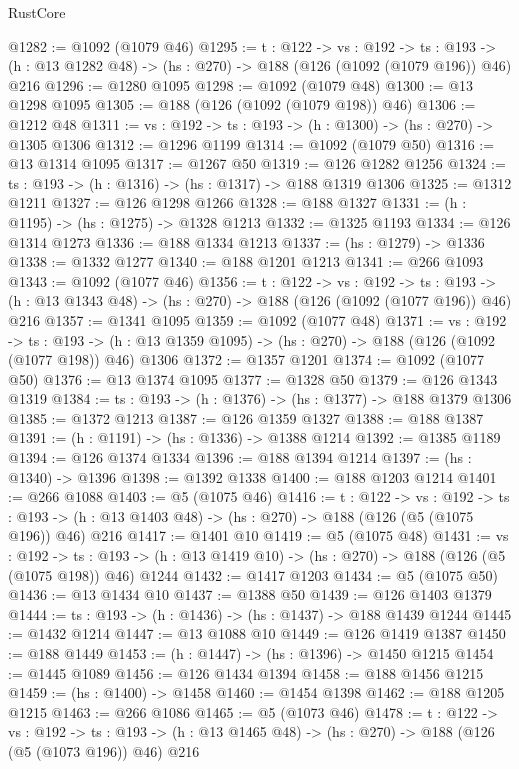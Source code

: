 \begin{lexlean}{RustCore}
\begin{coremodule}
@1282 := @1092 (@1079 @46)
@1295 := {t : @122} ->
  {vs : @192} ->
  {ts : @193} -> (h : @13 @1282 @48) -> (hs : @270) -> @188 (@126 (@1092 (@1079 @196)) @46) @216
@1296 := @1280 @1095
@1298 := @1092 (@1079 @48)
@1300 := @13 @1298 @1095
@1305 := @188 (@126 (@1092 (@1079 @198)) @46)
@1306 := @1212 @48
@1311 := {vs : @192} -> {ts : @193} -> (h : @1300) -> (hs : @270) -> @1305 @1306
@1312 := @1296 @1199
@1314 := @1092 (@1079 @50)
@1316 := @13 @1314 @1095
@1317 := @1267 @50
@1319 := @126 @1282 @1256
@1324 := {ts : @193} -> (h : @1316) -> (hs : @1317) -> @188 @1319 @1306
@1325 := @1312 @1211
@1327 := @126 @1298 @1266
@1328 := @188 @1327
@1331 := (h : @1195) -> (hs : @1275) -> @1328 @1213
@1332 := @1325 @1193
@1334 := @126 @1314 @1273
@1336 := @188 @1334 @1213
@1337 := (hs : @1279) -> @1336
@1338 := @1332 @1277
@1340 := @188 @1201 @1213
@1341 := @266 @1093
@1343 := @1092 (@1077 @46)
@1356 := {t : @122} ->
  {vs : @192} ->
  {ts : @193} -> (h : @13 @1343 @48) -> (hs : @270) -> @188 (@126 (@1092 (@1077 @196)) @46) @216
@1357 := @1341 @1095
@1359 := @1092 (@1077 @48)
@1371 := {vs : @192} ->
  {ts : @193} -> (h : @13 @1359 @1095) -> (hs : @270) -> @188 (@126 (@1092 (@1077 @198)) @46) @1306
@1372 := @1357 @1201
@1374 := @1092 (@1077 @50)
@1376 := @13 @1374 @1095
@1377 := @1328 @50
@1379 := @126 @1343 @1319
@1384 := {ts : @193} -> (h : @1376) -> (hs : @1377) -> @188 @1379 @1306
@1385 := @1372 @1213
@1387 := @126 @1359 @1327
@1388 := @188 @1387
@1391 := (h : @1191) -> (hs : @1336) -> @1388 @1214
@1392 := @1385 @1189
@1394 := @126 @1374 @1334
@1396 := @188 @1394 @1214
@1397 := (hs : @1340) -> @1396
@1398 := @1392 @1338
@1400 := @188 @1203 @1214
@1401 := @266 @1088
@1403 := @5 (@1075 @46)
@1416 := {t : @122} ->
  {vs : @192} ->
  {ts : @193} -> (h : @13 @1403 @48) -> (hs : @270) -> @188 (@126 (@5 (@1075 @196)) @46) @216
@1417 := @1401 @10
@1419 := @5 (@1075 @48)
@1431 := {vs : @192} ->
  {ts : @193} -> (h : @13 @1419 @10) -> (hs : @270) -> @188 (@126 (@5 (@1075 @198)) @46) @1244
@1432 := @1417 @1203
@1434 := @5 (@1075 @50)
@1436 := @13 @1434 @10
@1437 := @1388 @50
@1439 := @126 @1403 @1379
@1444 := {ts : @193} -> (h : @1436) -> (hs : @1437) -> @188 @1439 @1244
@1445 := @1432 @1214
@1447 := @13 @1088 @10
@1449 := @126 @1419 @1387
@1450 := @188 @1449
@1453 := (h : @1447) -> (hs : @1396) -> @1450 @1215
@1454 := @1445 @1089
@1456 := @126 @1434 @1394
@1458 := @188 @1456 @1215
@1459 := (hs : @1400) -> @1458
@1460 := @1454 @1398
@1462 := @188 @1205 @1215
@1463 := @266 @1086
@1465 := @5 (@1073 @46)
@1478 := {t : @122} ->
  {vs : @192} ->
  {ts : @193} -> (h : @13 @1465 @48) -> (hs : @270) -> @188 (@126 (@5 (@1073 @196)) @46) @216

\end{coremodule}
\end{lexlean}
